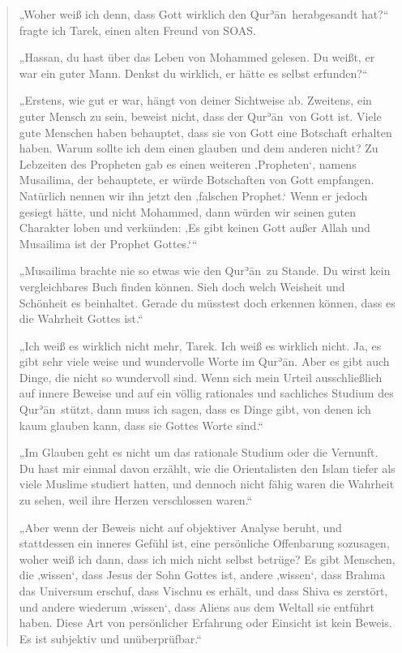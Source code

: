 \documentclass[12pt]{memoir}
\def\´{ʾ} %
\def \Quran{Qur\-\´ān} %
\begin{document}
\begin{quote}
„Woher weiß ich denn, dass Gott wirklich den \Quran\ herabgesandt hat?“
fragte ich Tarek, einen alten Freund von SOAS.

„Hassan, du hast über das Leben von Mohammed gelesen.
Du weißt, er war ein guter Mann.
Denkst du wirklich, er hätte es selbst erfunden?“

„Erstens, wie gut er war, hängt von deiner Sichtweise ab.
Zweitens, ein guter Mensch zu sein, beweist nicht,
dass der \Quran\ von Gott ist.
Viele gute Menschen haben behauptet,
dass sie von Gott eine Botschaft erhalten haben.
Warum sollte ich dem einen glauben und dem anderen nicht?
Zu Lebzeiten des Propheten gab es einen weiteren ‚Propheten‘,
namens Musailima, der behauptete, er würde Botschaften von Gott empfangen.
Natürlich nennen wir ihn jetzt den ‚falschen Prophet.‘
Wenn er jedoch gesiegt hätte, und nicht Mohammed,
dann würden wir seinen guten Charakter loben und verkünden:
‚Es gibt keinen Gott außer Allah und Musailima ist der Prophet Gottes.‘“

„Musailima brachte nie so etwas wie den \Quran\ zu Stande.
Du wirst kein vergleichbares Buch finden können.
Sieh doch welch Weisheit und Schönheit es beinhaltet.
Gerade du müsstest doch erkennen können, dass es die Wahrheit Gottes ist.“

„Ich weiß es wirklich nicht mehr, Tarek.
Ich weiß es wirklich nicht.
Ja, es gibt sehr viele weise und wundervolle Worte im \Quran.
Aber es gibt auch Dinge, die nicht so wundervoll sind.
Wenn sich mein Urteil ausschließlich auf innere Beweise und
auf ein völlig rationales und sachliches Studium des \Quran\ stützt,
dann muss ich sagen, dass es Dinge gibt,
von denen ich kaum glauben kann, dass sie Gottes Worte sind.“

„Im Glauben geht es nicht um das rationale Studium oder die Vernunft.
Du hast mir einmal davon erzählt, wie die Orientalisten
den Islam tiefer als viele Muslime studiert hatten,
und dennoch nicht fähig waren die Wahrheit zu sehen,
weil ihre Herzen verschlossen waren.“

„Aber wenn der Beweis nicht auf objektiver Analyse beruht,
und stattdessen ein inneres Gefühl ist, eine persönliche Offenbarung sozusagen,
woher weiß ich dann, dass ich mich nicht selbst betrüge?
Es gibt Menschen, die ‚wissen‘, dass Jesus der Sohn Gottes ist,
andere ‚wissen‘, dass Brahma das Universum erschuf,
dass Vischnu es erhält, und dass Shiva es zerstört,
und andere wiederum ‚wissen‘,
dass Aliens aus dem Weltall sie entführt haben.
Diese Art von persönlicher Erfahrung oder Einsicht ist kein Beweis.
Es ist subjektiv und unüberprüfbar.“


\end{quote}
\end{document}
